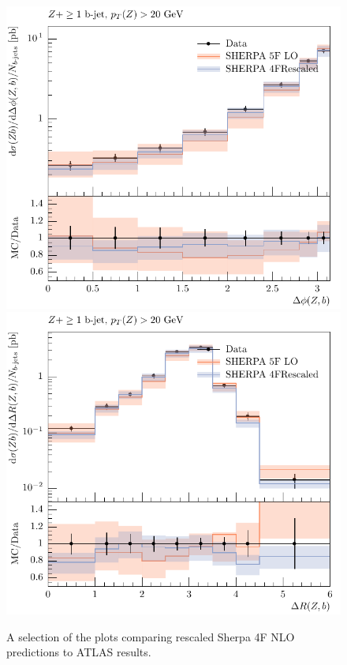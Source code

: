 \documentclass[11pt]{cernrep}
\begin{document}
\begin{figure}[htbp]
\begin{center}
   \includegraphics[scale=0.65]{figs/zbb/sherpa/d11-x01-y01_rescaled.pdf} 
   \includegraphics[scale=0.65]{figs/zbb/sherpa/d13-x01-y01_rescaled.pdf}
\caption{A selection of the plots
  comparing rescaled Sherpa 4F NLO predictions to ATLAS results.}
\label{zbb-sherpa-scaled}
\end{center}
\end{figure}
\end{document}
